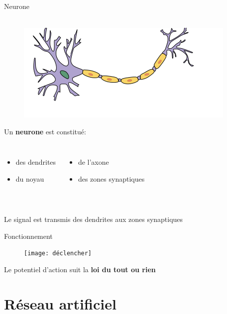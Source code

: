 \documentclass[10pt]{beamer}
\begin{document}
\begin{frame}{Neurone}
	$ $\\$ $
	\begin{figure}
  \includegraphics[scale=0.6]{neuron2}
	\centering
	\end{figure}
	Un \textbf{neurone} est constitu\'e:

  \begin{columns}[T,onlytextwidth]
      \begin{itemize}
        \item des dendrites \item du noyau
      \end{itemize}

      \begin{itemize}
        \item de l'axone \item des zones synaptiques
      \end{itemize}
  \end{columns}
	$ $\\
	Le signal est transmis des dendrites aux zones synaptiques
\end{frame}

{
\begin{frame}{Fonctionnement}
	\begin{figure}
  \texttt{[image: déclencher]}
	\centering
	\end{figure}
	Le potentiel d'action suit la \textbf{loi du tout ou rien}
\end{frame}
}


\section{R\'eseau artificiel}
\end{document}
